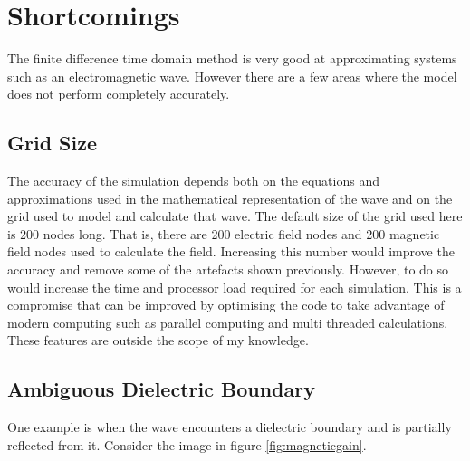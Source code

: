 
\section{Shortcomings} %
\label{sec:shortcomings}
The finite difference time domain method is very good at approximating systems such as an electromagnetic wave. However there are a few areas where the model does not perform completely accurately. 

\subsection{Grid Size} %
\label{sub:grid_size}
The accuracy of the simulation depends both on the equations and approximations used in the mathematical representation of the wave and on the grid used to model and calculate that wave. The default size of the grid used here is 200 nodes long. That is, there are 200 electric field nodes and 200 magnetic field nodes used to calculate the field. Increasing this number would improve the accuracy and remove some of the artefacts shown previously. However, to do so would increase the time and processor load required for each simulation. This is a compromise that can be improved by optimising the code to take advantage of modern computing such as parallel computing and multi threaded calculations. These features are outside the scope of my knowledge.

\subsection{Ambiguous Dielectric Boundary} %
\label{sub:ambiguous_dielectric_boundary}

One example is when the wave encounters a dielectric boundary and is partially reflected from it. Consider the image in figure \ref{fig:magneticgain}.

